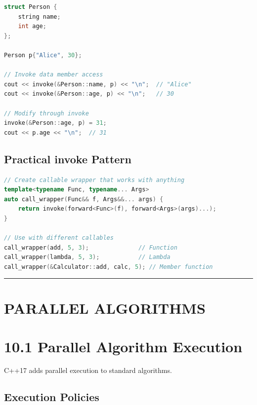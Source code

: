 \begin{lstlisting}[language={C++}]
struct Person {
    string name;
    int age;
};

Person p{"Alice", 30};

// Invoke data member access
cout << invoke(&Person::name, p) << "\n";  // "Alice"
cout << invoke(&Person::age, p) << "\n";   // 30

// Modify through invoke
invoke(&Person::age, p) = 31;
cout << p.age << "\n";  // 31
\end{lstlisting}

\hypertarget{practical-invoke-pattern}{%
\subsection{Practical invoke Pattern}\label{practical-invoke-pattern}}

\begin{lstlisting}[language={C++}]
// Create callable wrapper that works with anything
template<typename Func, typename... Args>
auto call_wrapper(Func&& f, Args&&... args) {
    return invoke(forward<Func>(f), forward<Args>(args)...);
}

// Use with different callables
call_wrapper(add, 5, 3);              // Function
call_wrapper(lambda, 5, 3);           // Lambda
call_wrapper(&Calculator::add, calc, 5); // Member function
\end{lstlisting}

\begin{center}\rule{0.5\linewidth}{0.5pt}\end{center}

\hypertarget{parallel-algorithms}{%
\section{PARALLEL ALGORITHMS}\label{parallel-algorithms}}

\hypertarget{parallel-algorithm-execution}{%
\section{10.1 Parallel Algorithm
Execution}\label{parallel-algorithm-execution}}

C++17 adds parallel execution to standard algorithms.

\hypertarget{execution-policies}{%
\subsection{Execution Policies}\label{execution-policies}}

